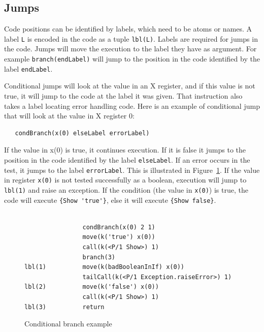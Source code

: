 \documentclass[a4paper]{memoir}
\begin{document}
\subsection{Jumps}\label{sec:opcode:jumps}
Code positions can be identified by labels, which need to be atoms or names. A label \lstinline!L! is encoded in the code as a tuple \lstinline!lbl(L)!. 
Labels are required for jumps in the code. 
Jumps will move the execution to the label they have as argument. For example \lstinline!branch(endLabel)! will jump to the position in the code identified by the label \lstinline!endLabel!.

Conditional jumps will look at the value in an X register, and if this value is
not true, it will jump to the code at the label it was given. That instruction
also takes a label locating error handling code. Here is an example of
conditional jump that will look at the value in X register 0:
\begin{lstlisting}
   condBranch(x(0) elseLabel errorLabel)
\end{lstlisting}
If the value in x(0) is
true, it continues execution. If it is false it jumps to the position in the
code identified by the label \lstinline!elseLabel!. If an error occurs in the
test, it jumps to the label \lstinline!errorLabel!. This is illustrated in Figure~\ref{fig:target:condBranch}.
If the value in register \lstinline!x(0)! is not tested successfully as a
boolean, execution will jump to \lstinline!lbl(1)! and raise an exception. If
the condition (the value in \lstinline!x(0)!) is true, the code will execute
\lstinline!{Show 'true'}!, else it will execute \lstinline!{Show false}!.

\begin{figure}[ht]
\begin{lstlisting}

                condBranch(x(0) 2 1)
                move(k('true') x(0))
                call(k(<P/1 Show>) 1)
                branch(3)
lbl(1)          move(k(badBooleanInIf) x(0))
                tailCall(k(<P/1 Exception.raiseError>) 1)
lbl(2)          move(k('false') x(0))
                call(k(<P/1 Show>) 1)
lbl(3)          return

\end{lstlisting}
\caption{Conditional branch example}
\label{fig:target:condBranch}
\end{figure}
\end{document}
